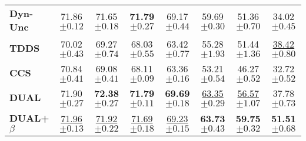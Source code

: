 \begin{table}[ht]
\begin{tabular}{lccccccc}
    \textbf{Dyn-Unc} & 71.86 \scriptsize{$ \pm 0.12 $} & 71.65 \scriptsize{$ \pm 0.18 $} & \textbf{71.79} \scriptsize{$ \pm 0.27 $} & 69.17 \scriptsize{$ \pm 0.44 $} & 59.69 \scriptsize{$ \pm 0.30 $} & 51.36 \scriptsize{$ \pm 0.70 $} & 34.02 \scriptsize{$ \pm 0.45 $} \\
    
    \textbf{TDDS} & 70.02 \scriptsize{$ \pm 0.43 $} & 69.27 \scriptsize{$ \pm 0.74 $} & 68.03 \scriptsize{$ \pm 0.55 $} & 63.42 \scriptsize{$ \pm 0.77 $} & 55.28 \scriptsize{$ \pm 1.93 $} & 51.44 \scriptsize{$ \pm 1.36 $} & \underline{38.42} \scriptsize{$ \pm 0.80 $} \\
    
    \textbf{CCS} & 70.84 \scriptsize{$ \pm 0.41 $} & 69.08 \scriptsize{$ \pm 0.41 $} & 68.11 \scriptsize{$ \pm 0.09 $} & 63.36 \scriptsize{$ \pm 0.16 $} & 53.21 \scriptsize{$ \pm 0.54 $} & 46.27 \scriptsize{$ \pm 0.52 $} & 32.72 \scriptsize{$ \pm 0.52 $} \\
    
    \midrule
    
    \textbf{DUAL} & 71.90 \scriptsize{$ \pm 0.27 $} & \textbf{72.38} \scriptsize{$ \pm 0.27 $} & \textbf{71.79} \scriptsize{$ \pm 0.11 $} & \textbf{69.69} \scriptsize{$ \pm 0.18 $} & \underline{63.35} \scriptsize{$ \pm 0.29 $} & \underline{56.57} \scriptsize{$ \pm 1.07 $} & 37.78 \scriptsize{$ \pm 0.73 $} \\
    
    \textbf{DUAL+$\beta$} & \underline{71.96} \scriptsize{$ \pm 0.13 $} & \underline{71.92} \scriptsize{$ \pm 0.22 $} & \underline{71.69} \scriptsize{$ \pm 0.18 $} & \underline{69.23} \scriptsize{$ \pm 0.15 $} & \textbf{63.73} \scriptsize{$ \pm 0.43 $} & \textbf{59.75} \scriptsize{$ \pm 0.32 $} & \textbf{51.51} \scriptsize{$ \pm 0.68 $} \\
    
    \bottomrule
\end{tabular}
\end{table}







